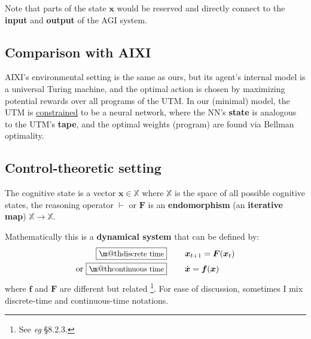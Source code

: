 \documentclass[orivec]{llncs}
\makeatletter
\newcommand{\emp}[1]{\textbf{#1}}
\newcommand{\vect}[1]{\boldsymbol{#1}}
\renewcommand{\boxed}[1]{\fbox{\m@th$\displaystyle\scalebox{0.9}{#1}$} \,}
\makeatother
\begin{document}
Note that parts of the state $\vect{x}$ would be reserved and directly connect to the \textbf{input} and \textbf{output} of the AGI system.


\subsection{Comparison with AIXI \cite{Wikipedia-AIXI}}

AIXI's environmental setting is the same as ours, but its agent's internal model is a universal Turing machine, and the optimal action is chosen by maximizing potential rewards over all programs of the UTM.  In our (minimal) model, the UTM is \uline{constrained} to be a neural network, where the NN's \textbf{state} is analogous to the UTM's \textbf{tape}, and the optimal weights (program) are found via Bellman optimality.

\subsection{Control-theoretic setting}
\label{sec:control-theory}

The cognitive state is a vector $\vect{x} \in \mathbb{X}$ where $\mathbb{X}$ is the space of all possible cognitive states, the reasoning operator $\vdash$ or $\vect{F}$ is an \textbf{endomorphism} (an \textbf{iterative map}) $\mathbb{X} \rightarrow \mathbb{X}$.

Mathematically this is a \emp{dynamical system} that can be defined by:
\begin{eqnarray}
\boxed{\mbox{discrete time}} \quad \quad & \vect{x}_{t+1} = \vect{F}(\vect{x}_t) \label{eqn0}\\
\mbox{or } \boxed{\mbox{continuous time}} \quad \quad & \dot{\vect{x}} = \vect{f}(\vect{x}) \label{eqn1}
\end{eqnarray}
where $\vect{f}$ and $\vect{F}$ are different but related
\footnote{
	See \textit{eg} \cite{Dolotin2007} \S8.2.3.
}.
For ease of discussion, sometimes I mix discrete-time and continuous-time notations.
\end{document}
